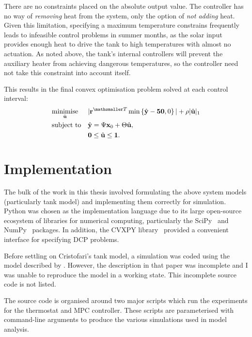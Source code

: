 There are no constraints placed on the absolute output value.
The controller has no way of \emph{removing} heat from the system, only the option of \emph{not adding} heat.
Given this limitation, specifying a maximum temperature constrains frequently leads to infeasible control problems in summer months, as the solar input provides enough heat to drive the tank to high temperatures with almost no actuation.
As noted above, the tank's internal controllers will prevent the auxiliary heater from achieving dangerous temperatures, so the controller need not take this constraint into account itself.

This results in the final convex optimisation problem solved at each control interval:
\begin{equation}
   \label{eq:controller-problem}
   \begin{aligned}
      & \underset{\hvec{u}}{\text{minimise}}
      & & |\vec{r}\transpose \min \left\{ \hvec{y} - \vec{50}, 0 \right\}| + \rho |\hvec{u}|_1 \\
      & \text{subject to}
      & & \hvec{y} = \Psi \vec{x}_0 + \Theta \hvec{u}, \\
      &&& \vec{0} \le \hvec{u} \le \vec{1}.
   \end{aligned}
\end{equation}

\section{Implementation}

The bulk of the work in this thesis involved formulating the above system models (particularly tank model) and implementing them correctly for simulation.
Python was chosen as the implementation language due to its large open-source ecosystem of libraries for numerical computing, particularly the SciPy~\cite{SCIPY} and NumPy~\cite{Walt11} packages.
In addition, the CVXPY library~\cite{CVXPY} provided a convenient interface for specifying DCP problems.

Before settling on Cristofari's tank model, a simulation was coded using the model described by \textcite{Pfeiffer11}.
However, the description in that paper was incomplete and I was unable to reproduce the model in a working state.
This incomplete source code is not listed.

The source code is organised around two major scripts which run the experiments for the thermostat and MPC controller.
These scripts are parameterised with command-line arguments to produce the various simulations used in model analysis.

